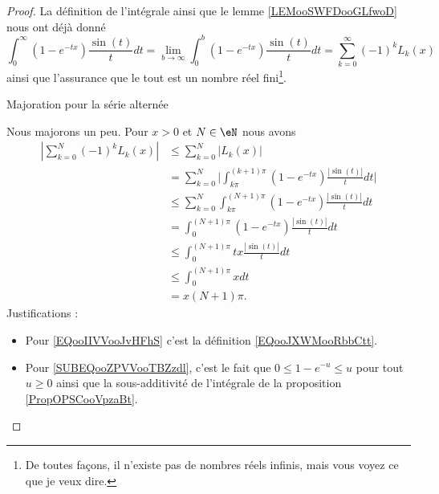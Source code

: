\begin{proof}
	La définition de l'intégrale ainsi que le lemme \ref{LEMooSWFDooGLfwoD} nous ont déjà donné
	\begin{equation}
		\int_0^{\infty}(1- e^{-tx})\frac{ \sin(t) }{ t }dt=\lim_{b\to \infty} \int_0^b(1- e^{-tx})\frac{ \sin(t) }{ t }dt=\sum_{k=0}^{\infty}(-1)^kL_k(x)
	\end{equation}
	ainsi que l'assurance que le tout est un nombre réel fini\footnote{De toutes façons, il n'existe pas de nombres réels infinis, mais vous voyez ce que je veux dire.}.

	\begin{subproof}
		\item[Majoration pour la série alternée]

		Nous majorons un peu. Pour \( x>0\) et \( N\in \eN\) nous avons
		\begin{subequations}        \label{SUBEQSQooLIGNooNAzpmi}
			\begin{align}
				| \sum_{k=0}^N(-1)^kL_k(x) | & \leq \sum_{k=0}^N| L_k(x) |                                                                                         \\
				                             & =\sum_{k=0}^N\big|   \int_{k\pi}^{(k+1)\pi}(1- e^{-tx})\frac{ | \sin(t) | }{ t }dt   \big| \label{EQooIIVVooJvHFhS} \\
				                             & \leq \sum_{k=0}^N\int_{k\pi}^{(N+1)\pi}(1- e^{-tx})\frac{ | \sin(t) | }{ t }dt                                      \\
				                             & =\int_0^{(N+1)\pi}(1- e^{-tx})\frac{ | \sin(t) | }{ t }dt                                                           \\
				                             & \leq \int_0^{(N+1)\pi}tx\frac{ | \sin(t) | }{ t }dt    \label{SUBEQooZPVVooTBZzdl}                                  \\
				                             & \leq \int_0^{(N+1)\pi}xdt                                                                                           \\
				                             & =x(N+1)\pi.
			\end{align}
		\end{subequations}
		Justifications :
		\begin{itemize}
			\item Pour \eqref{EQooIIVVooJvHFhS} c'est la définition \eqref{EQooJXWMooRbbCtt}.
			\item Pour \eqref{SUBEQooZPVVooTBZzdl}, c'est le fait que \( 0\leq 1- e^{-u}\leq u\) pour tout \( u\geq 0\) ainsi que la sous-additivité de l'intégrale de la proposition \ref{PropOPSCooVpzaBt}.
		\end{itemize}


\end{subproof}
\end{proof}

